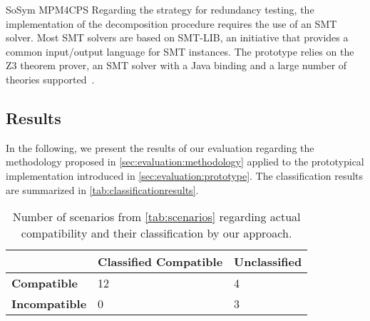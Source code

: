 \begin{copiedFrom}{SoSym MPM4CPS}
Regarding the strategy for redundancy testing, the implementation of the decomposition procedure requires the use of an SMT solver. Most SMT solvers are based on SMT-LIB, an initiative that provides a common input/output language for SMT instances. The prototype relies on the Z3 theorem prover, an SMT solver with a Java binding and a large number of theories supported~\cite{z32008}.




\subsection{Results}

In the following, we present the results of our evaluation regarding the methodology proposed in \autoref{sec:evaluation:methodology} applied to the prototypical implementation introduced in \autoref{sec:evaluation:prototype}.
The classification results are summarized in \autoref{tab:classificationresults}.

\begin{table}
    \centering
    \renewcommand{\arraystretch}{1.4}%
    \setlength\tabcolsep{4 pt}
    \begin{tabular}{L{2.2cm} C{3cm} C{2.3cm}}
        \toprule
         & \textbf{Classified Compatible} & \textbf{Unclassified} \\
         \midrule
         \textbf{Compatible} & 12 & 4\\
         \textbf{Incompatible} & 0 & 3\\
         \bottomrule
    \end{tabular}
    \caption{Number of scenarios from \autoref{tab:scenarios} regarding actual compatibility and their classification by our approach.}
    \label{tab:classificationresults}
\end{table}


\end{copiedFrom}

